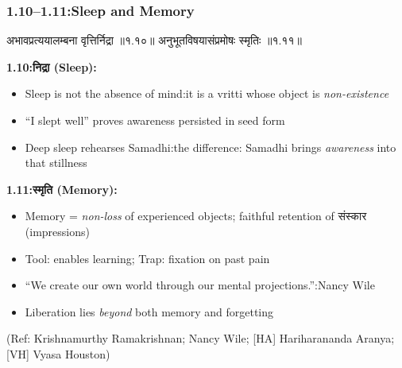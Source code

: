 \begin{frame}[fragile]\frametitle{1.10–1.11:Sleep and Memory}

\begin{sanskrit}
अभावप्रत्ययालम्बना वृत्तिर्निद्रा ॥१.१०॥
अनुभूतविषयासंप्रमोषः स्मृतिः ॥१.११॥
\end{sanskrit}

\textbf{1.10:निद्रा (Sleep):}
\begin{itemize}
\item Sleep is not the absence of mind:it is a vritti whose object is \emph{non-existence}
\item ``I slept well'' proves awareness persisted in seed form
\item Deep sleep rehearses Samadhi:the difference: Samadhi brings \emph{awareness} into that stillness
\end{itemize}

\textbf{1.11:स्मृति (Memory):}
\begin{itemize}
\item Memory = \emph{non-loss} of experienced objects; faithful retention of संस्कार (impressions)
\item Tool: enables learning; Trap: fixation on past pain
\item ``We create our own world through our mental projections.'':Nancy Wile
\item Liberation lies \emph{beyond} both memory and forgetting
\end{itemize}

\tiny{(Ref: Krishnamurthy Ramakrishnan; Nancy Wile; [HA] Hariharananda Aranya; [VH] Vyasa Houston)}

\end{frame}

